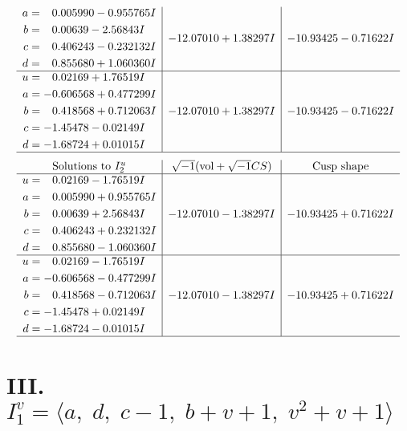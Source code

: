 \documentclass[1p]{elsarticle_modified}
\theoremstyle{definition}
\newcommand{\I}{\sqrt{-1}}
\begin{document}
$$\begin{array}{c|c|c}
\begin{aligned}
a &= \phantom{-}0.005990 - 0.955765 I \\
b &= \phantom{-}0.00639 - 2.56843 I \\
c &= \phantom{-}0.406243 - 0.232132 I \\
d &= \phantom{-}0.855680 + 1.060360 I\end{aligned}
 & -12.07010 + 1.38297 I & -10.93425 - 0.71622 I \\ \hline\begin{aligned}
u &= \phantom{-}0.02169 + 1.76519 I \\
a &= -0.606568 + 0.477299 I \\
b &= \phantom{-}0.418568 + 0.712063 I \\
c &= -1.45478 - 0.02149 I \\
d &= -1.68724 + 0.01015 I\end{aligned}
 & -12.07010 + 1.38297 I & -10.93425 - 0.71622 I\\
 \hline 
 \end{array}$$\newpage$$\begin{array}{c|c|c}  
\text{Solutions to }I^u_{2}& \I (\text{vol} + \sqrt{-1}CS) & \text{Cusp shape}\\
 \hline 
\begin{aligned}
u &= \phantom{-}0.02169 - 1.76519 I \\
a &= \phantom{-}0.005990 + 0.955765 I \\
b &= \phantom{-}0.00639 + 2.56843 I \\
c &= \phantom{-}0.406243 + 0.232132 I \\
d &= \phantom{-}0.855680 - 1.060360 I\end{aligned}
 & -12.07010 - 1.38297 I & -10.93425 + 0.71622 I \\ \hline\begin{aligned}
u &= \phantom{-}0.02169 - 1.76519 I \\
a &= -0.606568 - 0.477299 I \\
b &= \phantom{-}0.418568 - 0.712063 I \\
c &= -1.45478 + 0.02149 I \\
d &= -1.68724 - 0.01015 I\end{aligned}
 & -12.07010 - 1.38297 I & -10.93425 + 0.71622 I\\
 \hline 
 \end{array}$$\newpage\newpage\renewcommand{\arraystretch}{1}
\centering \section*{III. $I^v_{1}= \langle a,\;d,\;c-1,\;b+v+1,\;v^2+v+1 \rangle$}
\end{document}
